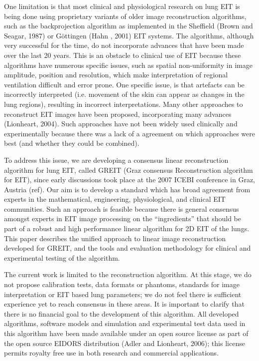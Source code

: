 \documentclass[12pt]{iopart}
\begin{document}
One limitation is that most clinical and physiological research
on lung EIT is being done using proprietary variants of
older image reconstruction algorithms, such as the backprojection
algorithm as implemented
in the Sheffield (Brown and Seagar, 1987)
or G\"ottingen (Hahn \etal, 2001) EIT systems.
The algorithms, although very successful for the time,
   do not incorporate advances that have been made over the last
   20 years.
This is an obstacle to clinical use of EIT because
these algorithms have numerous specific issues, such
   as spatial non-uniformity in image amplitude, position
   and resolution, which make interpretation of regional
   ventilation difficult and error prone.
One specific issue, is that 
artefacts can be incorrectly interpreted (i.e. movement of
   the skin can appear as changes in the lung regions),
   resulting in incorrect interpretations.
Many other approaches to reconstruct EIT images have been
proposed, incorporating many advances (Lionheart, 2004).
Such approaches
have not been widely used clinically and experimentally
because there was a lack of a agreement on which
approaches were best (and whether they could be combined).

To address this issue, we are developing a
consensus linear reconstruction algorithm for lung EIT,
called GREIT (Graz consensus Reconstruction algorithm for EIT),
since early discussions took place at the 2007 ICEBI conference
in Graz, Austria (ref). Our aim is to develop a standard which
has broad agreement from experts in the mathematical,
engineering, physiological, and clinical EIT communities.
Such an approach is feasible because there is general
consensus amongst experts in EIT image processing on
the ``ingredients'' that should
be part of a robust and high performance linear algorithm
for 2D EIT of the lungs.
This paper describes the unified approach to 
linear image reconstruction developed for GREIT,
and the tools and evaluation methodology for
clinical and experimental testing of the algorithm.

The current work is limited to the reconstruction algorithm.
At this stage, we do not propose calibration tests, data
 formats or phantoms, standards
for image interpretation or EIT based lung parameters; 
we do not feel there is sufficient experience yet to reach
consensus in these areas.
It is important to clarify that there is no financial
goal to the development of this algorithm.
All developed algorithms, software
models and simulation and experimental test data used
in this algorithm have been
made available under an open source license as part of
the open source EIDORS distribution (Adler and Lionheart, 2006);
this license permits
royalty free use in both research and commercial applications.
\end{document}
